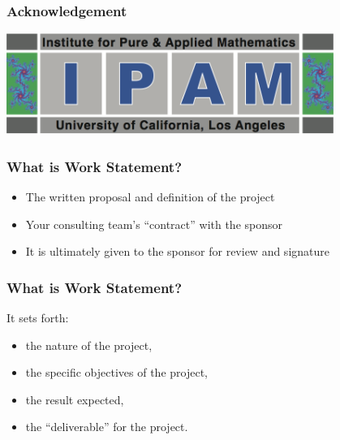 \documentclass[hyperref={colorlinks=false},compress,handout,10pt]{beamer}
\let\olditem\item
\renewcommand{\item}{\setlength{\itemsep}{0.5\baselineskip}\olditem}
\begin{document}
\begin{frame}
    \frametitle{Acknowledgement}
    \begin{center}
        \href{http://www.ipam.ucla.edu/programs/rips2011/}{
        \includegraphics[width=0.8\textwidth]{images/ipam}}        
    \end{center}
\end{frame}
\begin{frame}
    \frametitle{What is Work Statement?}
    \begin{itemize}
        \item The written proposal and definition of the project
            \vspace{1cm}
        \item Your consulting team's ``contract'' with the sponsor
            \vspace{1cm}
        \item It is ultimately given to the sponsor for review and signature
    \end{itemize}
\end{frame}

\begin{frame}
    \frametitle{What is Work Statement?}
It sets forth: 
    \begin{itemize}
        \item the nature of the project,
        \item the specific objectives of the project, 
        \item the result expected, 
        \item the ``deliverable'' for the project.
    \end{itemize}
\end{frame}
\end{document}
